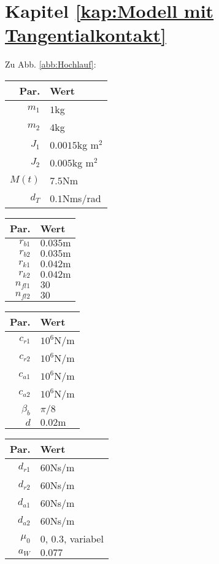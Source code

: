 \section{Kapitel \ref{kap:Modell mit Tangentialkontakt}}
Zu Abb. \ref{abb:Hochlauf}:
\begin{center}
\begin{tabular}{r|l}
Par.&Wert\\\hline
$m_1 $&$1$kg\\
$m_2 $&$ 4$kg\\
$J_1 $&$0.0015$kg m$^2$\\
$J_2 $&$ 0.005$kg m$^2$\\
$M(t) $&$7.5$Nm\\
$d_T$&$0.1$Nms/rad\\
\end{tabular}\hfill
\begin{tabular}{r|l}
Par.&Wert\\\hline
$r_{b1}$&$0.035\textrm{m}$\\
$r_{b2}$&$0.035\textrm{m}$\\
$r_{k1}$&$0.042\textrm{m}$\\
$r_{k2}$&$0.042\textrm{m}$\\
$n_{fl1}$&$30$\\
$n_{fl2}$&$30$\\
\end{tabular}\hfill
\begin{tabular}{r|l}
Par.&Wert\\\hline
$c_{r1}$&$10^{6}$N/m\\
$c_{r2}$&$10^{6}$N/m\\
$c_{a1}$&$10^{6}$N/m\\
$c_{a2}$&$10^{6}$N/m\\
$\beta_b $&$ \pi/8$\\
$d $&$ 0.02\textrm{m}$ \\
\end{tabular}\hfill
\begin{tabular}{r|l}
Par.&Wert\\\hline
$d_{r1}$&$60$Ns/m\\
$d_{r2}$&$60$Ns/m\\
$d_{a1}$&$60$Ns/m\\
$d_{a2}$&$60$Ns/m\\
$\mu_0$&$0$, $0.3$, variabel\\
$a_W $&$ 0.077$\\
\end{tabular}
\end{center}

